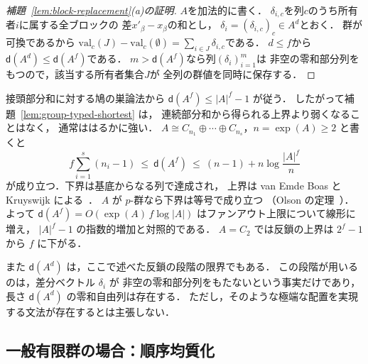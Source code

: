 \begin{proof}[補題~\ref{lem:block-replacement}(a)の証明]
$A$を加法的に書く．
$\delta_{i,c}$を列$c$のうち所有者$i$に属する全ブロックの
差$x'_\beta-x_\beta$の和とし，
$\delta_i=(\delta_{i,c})_c\in A^d$とおく．
群が可換であるから
$\mathrm{val}_c(J)-\mathrm{val}_c(\emptyset)
 =\sum_{i\in J}\delta_{i,c}$である．
$d\le f$から$\mathsf d(A^d)\le\mathsf d(A^f)$である．
$m>\mathsf d(A^f)$なら列$(\delta_i)_{i=1}^m$は
非空の零和部分列をもつので，該当する所有者集合$J$が
全列の群値を同時に保存する．
\end{proof}

\begin{remark}[零和定数の大きさ]
\label{rem:davenport-size}
接頭部分和に対する鳩の巣論法から $\mathsf d(A^f)\le|A|^f-1$ が従う．
したがって補題~\ref{lem:group-typed-shortest} は，
連続部分和から得られる上界より弱くなることはなく，
通常ははるかに強い．
$A\cong C_{n_1}\oplus\cdots\oplus C_{n_s}$，$n=\exp(A)\ge2$ と書くと
\[
 f\sum_{i=1}^{s}(n_i-1)\ \le\ \mathsf d(A^f)\ \le\
 (n-1)+n\log\frac{|A|^f}{n}
\]
が成り立つ．下界は基底からなる列で達成され，
上界は van Emde Boas と Kruyswijk による~\cite[Proposition~5.1.8, Theorem~5.5.5]{GeroldingerHalterKoch2006}．
$A$ が $p$-群なら下界は等号で成り立つ
（Olson の定理~\cite[Theorem~5.5.9]{GeroldingerHalterKoch2006}）．
よって $\mathsf d(A^f)=O(\exp(A)\,f\log|A|)$ はファンアウト上限について線形に増え，
$|A|^f-1$ の指数的増加と対照的である．
$A=C_2$ では反鎖の上界は $2^f-1$ から $f$ に下がる．

また $\mathsf d(A^d)$ は，ここで述べた反鎖の段階の限界でもある．
この段階が用いるのは，差分ベクトル $\delta_i$ が
非空の零和部分列をもたないという事実だけであり，
長さ $\mathsf d(A^d)$ の零和自由列は存在する．
ただし，そのような極端な配置を実現する文法が存在するとは主張しない．
\end{remark}

\subsection{一般有限群の場合：順序均質化}
\label{app:window-group}

